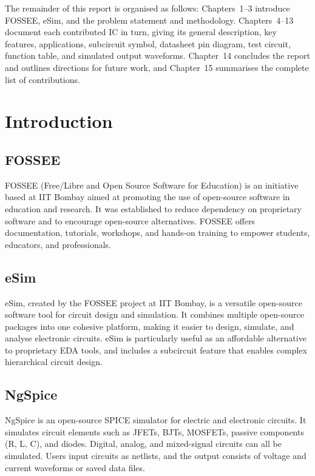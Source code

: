 \documentclass[12pt,a4paper]{report}
\begin{document}
The remainder of this report is organised as follows: Chapters~1--3
introduce FOSSEE, eSim, and the problem statement and methodology.
Chapters~4--13 document each contributed IC in turn, giving its general
description, key features, applications, subcircuit symbol, datasheet
pin diagram, test circuit, function table, and simulated output
waveforms. Chapter~14 concludes the report and outlines directions for
future work, and Chapter~15 summarises the complete list of
contributions.

\newpage

\tableofcontents
\listoffigures
\listoftables

\newpage
{}

\chapter{Introduction}

\section{FOSSEE}
FOSSEE (Free/Libre and Open Source Software for Education) is an initiative
based at IIT Bombay aimed at promoting the use of open-source software in
education and research. It was established to reduce dependency on
proprietary software and to encourage open-source alternatives. FOSSEE
offers documentation, tutorials, workshops, and hands-on training to
empower students, educators, and professionals.

\section{eSim}
eSim, created by the FOSSEE project at IIT Bombay, is a versatile
open-source software tool for circuit design and simulation. It combines
multiple open-source packages into one cohesive platform, making it easier
to design, simulate, and analyse electronic circuits. eSim is particularly
useful as an affordable alternative to proprietary EDA tools, and includes
a subcircuit feature that enables complex hierarchical circuit design.

\section{NgSpice}
NgSpice is an open-source SPICE simulator for electric and electronic
circuits. It simulates circuit elements such as JFETs, BJTs, MOSFETs,
passive components (R, L, C), and diodes. Digital, analog, and mixed-signal
circuits can all be simulated. Users input circuits as netlists, and the
output consists of voltage and current waveforms or saved data files.
\end{document}
